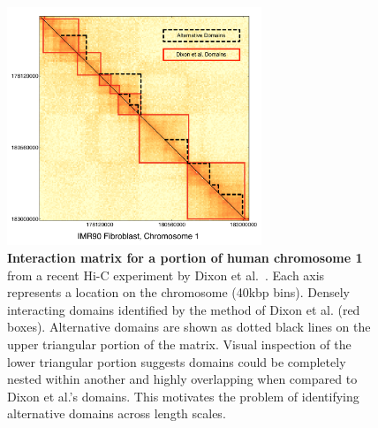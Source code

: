 \documentclass[12pt]{cmuthesis}
\begin{document}


  \begin{figure}[t!]
    \begin{center}
      \includegraphics[width=3in]{figures/HeatMapFig}
    \end{center}
    \caption{\textbf{Interaction matrix for a portion of human chromosome 1} from a recent Hi-C experiment by Dixon et al.~\cite{Dixon2012}. Each axis represents a location on the chromosome (40kbp bins).  Densely interacting domains identified by the method of Dixon et al. (red boxes).  Alternative domains are shown as dotted black lines on the upper triangular portion of the matrix.  Visual inspection of the lower triangular portion suggests domains could be completely nested within another and highly overlapping when compared to Dixon et al.'s domains. This motivates the problem of identifying alternative domains across length scales.}
    \label{armatus:heatmap}
  \end{figure}
\end{document}
